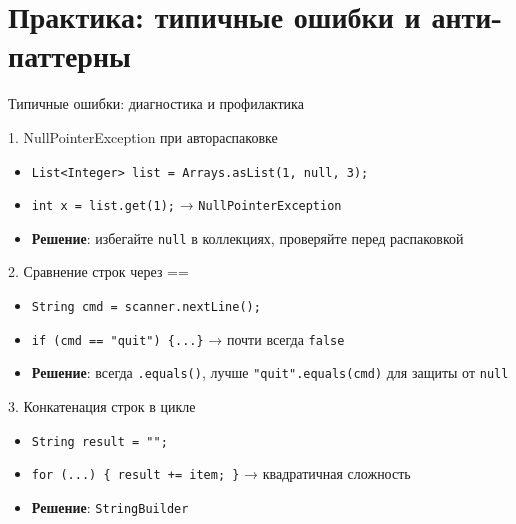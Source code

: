 \documentclass[aspectratio=169]{beamer}
\begin{document}
\section{Практика: типичные ошибки и анти-паттерны}

\begin{frame}{Типичные ошибки: диагностика и профилактика}
  \begin{block}{1. NullPointerException при автораспаковке}
    \begin{itemize}
      \item \texttt{List<Integer> list = Arrays.asList(1, null, 3);}
      \item \texttt{int x = list.get(1);} → \texttt{NullPointerException}
      \item \textbf{Решение}: избегайте \texttt{null} в коллекциях, проверяйте перед распаковкой
    \end{itemize}
  \end{block}
  \begin{block}{2. Сравнение строк через ==}
    \begin{itemize}
      \item \texttt{String cmd = scanner.nextLine();}
      \item \texttt{if (cmd == "quit") \{...\}} → почти всегда \texttt{false}
      \item \textbf{Решение}: всегда \texttt{.equals()}, лучше \texttt{"quit".equals(cmd)} для защиты от \texttt{null}
    \end{itemize}
  \end{block}
  \begin{block}{3. Конкатенация строк в цикле}
    \begin{itemize}
      \item \texttt{String result = "";}
      \item \texttt{for (...) \{ result += item; \}} → квадратичная сложность
      \item \textbf{Решение}: \texttt{StringBuilder}
    \end{itemize}
  \end{block}
\end{frame}
\end{document}
